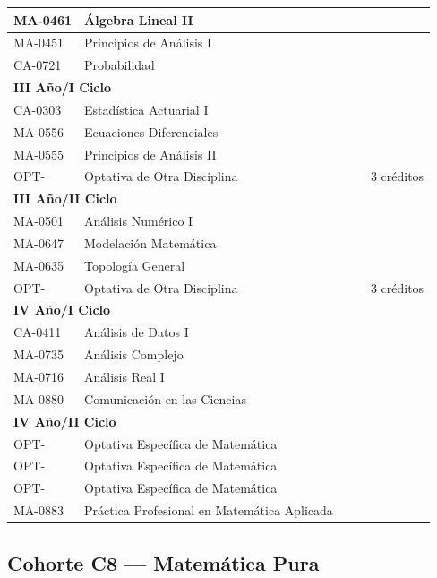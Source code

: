 \begin{longtable}{|p{2cm}|p{7cm}|p{1.6cm}|p{1.6cm}|p{2.8cm}|}
MA-0461 & Álgebra Lineal II &  &  &  \\ \hline
MA-0451 & Principios de Análisis I &  &  &  \\ \hline
CA-0721 & Probabilidad &  &  &  \\ \hline
\multicolumn{5}{|l|}{\cellcolor[HTML]{E6E6E6}\textbf{III Año/I Ciclo}} \\ \hline
CA-0303 & Estadística Actuarial I &  &  &  \\ \hline
MA-0556 & Ecuaciones Diferenciales &  &  &  \\ \hline
MA-0555 & Principios de Análisis II &  &  &  \\ \hline
OPT- & Optativa de Otra Disciplina &  &  & 3 créditos \\ \hline
\multicolumn{5}{|l|}{\cellcolor[HTML]{E6E6E6}\textbf{III Año/II Ciclo}} \\ \hline
MA-0501 & Análisis Numérico I &  &  &  \\ \hline
MA-0647 & Modelación Matemática &  &  &  \\ \hline
MA-0635 & Topología General &  &  &  \\ \hline
OPT- & Optativa de Otra Disciplina &  &  & 3 créditos \\ \hline
\multicolumn{5}{|l|}{\cellcolor[HTML]{E6E6E6}\textbf{IV Año/I Ciclo}} \\ \hline
CA-0411 & Análisis de Datos I &  &  &  \\ \hline
MA-0735 & Análisis Complejo &  &  &  \\ \hline
MA-0716 & Análisis Real I &  &  &  \\ \hline
MA-0880 & Comunicación en las Ciencias &  &  &  \\ \hline
\multicolumn{5}{|l|}{\cellcolor[HTML]{E6E6E6}\textbf{IV Año/II Ciclo}} \\ \hline
OPT- & Optativa Específica de Matemática &  &  &  \\ \hline
OPT- & Optativa Específica de Matemática &  &  &  \\ \hline
OPT- & Optativa Específica de Matemática &  &  &  \\ \hline
MA-0883 & Práctica Profesional en Matemática Aplicada &  &  &  \\ \hline
\end{longtable}

\subsection{Cohorte C8 --- Matemática Pura}
\label{anexo:estudioC8P}

